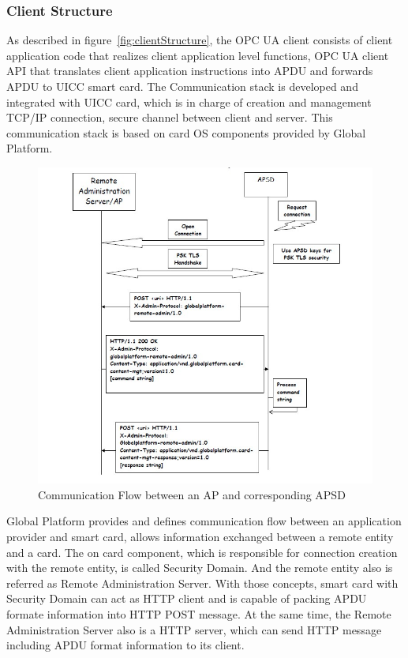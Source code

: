 \documentclass[]{llncs}
\begin{document}
\subsubsection{Client Structure}
As described in figure~\ref{fig:clientStructure}, the OPC UA client consists of client application code that realizes client application level functions, OPC UA client API that translates client application instructions into APDU and forwards APDU to UICC smart card. The Communication stack is developed and integrated with UICC card, which is in charge of creation and management TCP/IP connection, secure channel between client and server. This communication stack is based on card OS components provided by Global Platform. 
\begin{figure}
	\centering
	\includegraphics[width=1.2\textwidth]{apsd.jpg}
		\caption[ ]{Communication Flow between an AP and corresponding APSD\cite{ramGP}}
	\label{fig:apsd}
\end{figure}
Global Platform provides and defines communication flow between an application provider and smart card, allows information exchanged between a remote entity and a card. The on card component, which is responsible for connection creation with the remote entity, is called Security Domain. And the remote entity also is referred as Remote Administration Server. With those concepts, smart card with Security Domain can act as HTTP client and is capable of packing APDU formate information into HTTP POST message. At the same time, the Remote Administration Server also is a HTTP server, which can send HTTP message including APDU format information to its client.\cite{ramGP}
 
\end{document}

